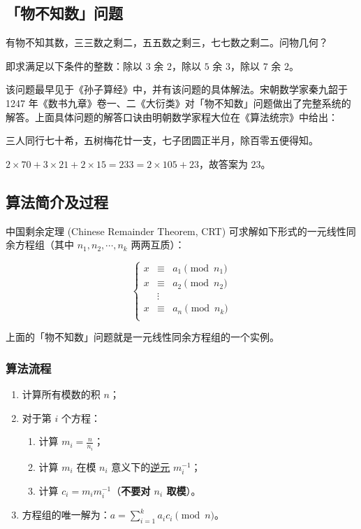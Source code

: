 
\subsection{「物不知数」问题}

\begin{QUOTE}{}{}
有物不知其数，三三数之剩二，五五数之剩三，七七数之剩二。问物几何？
\end{QUOTE}

即求满足以下条件的整数：除以 $3$ 余 $2$，除以 $5$ 余 $3$，除以 $7$ 余 $2$。

该问题最早见于《孙子算经》中，并有该问题的具体解法。宋朝数学家秦九韶于 1247 年《数书九章》卷一、二《大衍类》对「物不知数」问题做出了完整系统的解答。上面具体问题的解答口诀由明朝数学家程大位在《算法统宗》中给出：

\begin{QUOTE}{}{}
三人同行七十希，五树梅花廿一支，七子团圆正半月，除百零五便得知。
\end{QUOTE}

$2\times 70+3\times 21+2\times 15=233=2\times 105+23$，故答案为 $23$。

\subsection{算法简介及过程}

中国剩余定理 (Chinese Remainder Theorem, CRT) 可求解如下形式的一元线性同余方程组（其中 $n_1, n_2, \cdots, n_k$ 两两互质）：

$$
\left \{
\begin{array}{c}
x &\equiv& a_1 \pmod {n_1} \\
x &\equiv& a_2 \pmod {n_2} \\
  &\vdots& \\
x &\equiv& a_n \pmod {n_k} \\
\end{array}
\right.
$$

上面的「物不知数」问题就是一元线性同余方程组的一个实例。

\subsubsection{算法流程}

\begin{enumerate}
\item 计算所有模数的积 $n$；
\item 对于第 $i$ 个方程：
\begin{enumerate}
\item 计算 $m_i=\frac{n}{n_i}$；
\item 计算 $m_i$ 在模 $n_i$ 意义下的\href{/math/inverse/}{逆元} $m_i^{-1}$；
\item 计算 $c_i=m_im_i^{-1}$（\textbf{不要对 $n_i$ 取模}）。
\end{enumerate}
\item 方程组的唯一解为：$a=\sum_{i=1}^k a_ic_i \pmod n$。
\end{enumerate}

